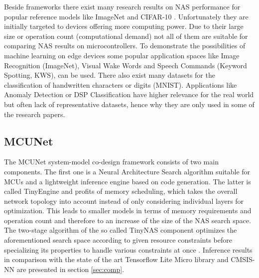 \documentclass[10pt,        %
               a4paper,     %
               journal,     %
               ]{IEEEtran}
\begin{document}
Beside frameworks there exist many research results on NAS performance for popular reference models like ImageNet \cite{imagenet2009} and CIFAR-10 \cite{cifar10}. Unfortunately they are initially targeted to devices offering more computing power. Due to their large size or operation count (computational demand) not all of them are suitable for comparing NAS results on microcontrollers. To demonstrate the possibilities of machine learning on edge devices some popular application spaces like Image Recognition (ImageNet), Visual Wake Words and Speech Commands (Keyword Spotting, KWS), can be used. There also exist many datasets for the classification of handwritten characters or digits (MNIST). Applications like Anomaly Detection or DSP Classification have higher relevance for the real world but often lack of representative datasets, hence why they are only used in some of the research papers.




\subsection{MCUNet}

The MCUNet system-model co-design framework consists of two main components. The first one is a Neural Architecture Search algorithm suitable for MCUs and a lightweight inference engine based on code generation. The latter is called TinyEngine and profits of memory scheduling, which takes the overall network topology into account instead of only considering individual layers for optimization. This leads to smaller models in terms of memory requirements and operation count and therefore to an increase of the size of the NAS search space. The two-stage algorithm of the so called TinyNAS component optimizes the aforementioned search space according to given resource constraints before specializing its properties to handle various constraints at once \cite{mcunet2020}. Inference results in comparison with the state of the art Tensorflow Lite Micro library and CMSIS-NN \cite{cmsisnn2018} are presented in section \ref{sec:comp}.
\end{document}
